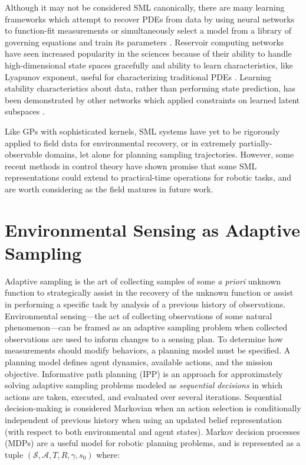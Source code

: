 Although it may not be considered SML canonically, there are many learning frameworks which attempt to recover PDEs from data by using neural networks to function-fit measurements \autocite{berg2019data,kaiser2018sparse} or simultaneously select a model from a library of governing equations and train its parameters \autocite{rudy2017data,sun2020neupde}. Reservoir computing networks have seen increased popularity in the sciences because of their ability to handle high-dimensional state spaces gracefully and ability to learn characteristics, like Lyapunov exponent, useful for characterizing traditional PDEs \autocite{pathak2017using}. Learning stability characteristics about data, rather than performing state prediction, has been demonstrated by other networks which applied constraints on learned latent subspaces \autocite{blanchard2019learning}.

Like GPs with sophisticated kernels, SML systems have yet to be rigorously applied to field data for environmental recovery, or in extremely partially-observable domains, let alone for planning sampling trajectories. However, some recent methods in control theory \autocite{chee2022knode,jiahaoonline,gan2020data} have shown promise that some SML representations could extend to practical-time operations for robotic tasks, and are worth considering as the field matures in future work.




\section{Environmental Sensing as Adaptive Sampling}
\label{sec:ipp}
Adaptive sampling is the art of collecting samples of some \emph{a priori} unknown function to strategically assist in the recovery of the unknown function or assist in performing a specific task by analysis of a previous history of observations. Environmental sensing---the act of collecting observations of some natural phenomenon---can be framed as an adaptive sampling problem when collected observations are used to inform changes to a sensing plan. To determine how measurements should modify behaviors, a planning model must be specified. A planning model defines agent dynamics, available actions, and the mission objective. Informative path planning (IPP) is an approach for approximately solving adaptive sampling problems modeled as \emph{sequential decisions} in which actions are taken, executed, and evaluated over several iterations. Sequential decision-making is considered Markovian when an action selection is conditionally independent of previous history when using an updated belief representation (with respect to both environmental and agent states). Markov decision processes \autocite{howard1960dynamic,bellman1957markovian} (MDPs) are a useful model for robotic planning problems, and is represented as a tuple $(\mathcal{S}, \mathcal{A}, T, R, \gamma, s_0)$ where:

